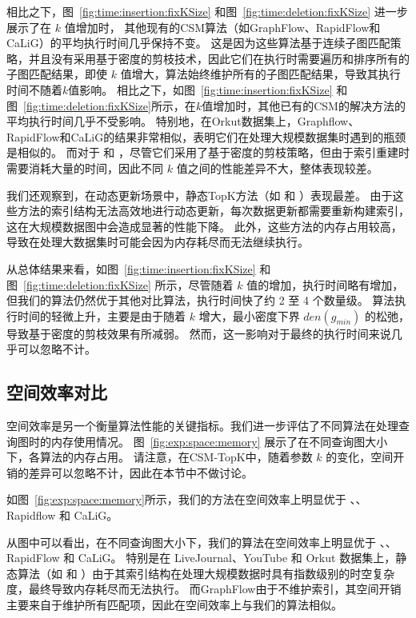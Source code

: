 相比之下，图~\ref{fig:time:insertion:fixKSize} 和图~\ref{fig:time:deletion:fixKSize} 进一步展示了在 $k$ 值增加时，
其他现有的CSM算法（如GraphFlow、RapidFlow和CaLiG）的平均执行时间几乎保持不变。
这是因为这些算法基于连续子图匹配策略，并且没有采用基于密度的剪枝技术，因此它们在执行时需要遍历和排序所有的子图匹配结果，即使 $k$ 值增大，算法始终维护所有的子图匹配结果，导致其执行时间不随着$k$值影响。
相比之下，如图~\ref{fig:time:insertion:fixKSize} 和图~\ref{fig:time:deletion:fixKSize}所示，在$k$值增加时，其他已有的CSM的解决方法的平均执行时间几乎不受影响。
特别地，在Orkut数据集上，Graphflow、RapidFlow和CaLiG的结果非常相似，表明它们在处理大规模数据集时遇到的瓶颈是相似的。
而对于 \itk 和 \pm，尽管它们采用了基于密度的剪枝策略，但由于索引重建时需要消耗大量的时间，因此不同 $k$ 值之间的性能差异不大，整体表现较差。

我们还观察到，在动态更新场景中，静态TopK方法（如 \itk 和 \pm）表现最差。
由于这些方法的索引结构无法高效地进行动态更新，每次数据更新都需要重新构建索引，这在大规模数据图中会造成显著的性能下降。
此外，这些方法的内存占用较高，导致在处理大数据集时可能会因为内存耗尽而无法继续执行。


从总体结果来看，如图~\ref{fig:time:insertion:fixKSize} 和图~\ref{fig:time:deletion:fixKSize} 所示，尽管随着 $k$ 值的增加，执行时间略有增加，但我们的算法仍然优于其他对比算法，执行时间快了约 2 至 4 个数量级。
算法执行时间的轻微上升，主要是由于随着 $k$ 增大，最小密度下界 $den(g_{min})$ 的松弛，导致基于密度的剪枝效果有所减弱。
然而，这一影响对于最终的执行时间来说几乎可以忽略不计。


\subsection{空间效率对比}
\label{ch5:space}

空间效率是另一个衡量算法性能的关键指标。我们进一步评估了不同算法在处理查询图时的内存使用情况。
图~\ref{fig:exp:space:memory} 展示了在不同查询图大小下，各算法的内存占用。
请注意，在CSM-TopK中，随着参数 $k$ 的变化，空间开销的差异可以忽略不计，因此在本节中不做讨论。

如图~\ref{fig:exp:space:memory}所示，我们的方法在空间效率上明显优于 \itk、\pm、Rapidflow 和 CaLiG。

从图中可以看出，在不同查询图大小下，我们的算法在空间效率上明显优于 \itk、\pm、RapidFlow 和 CaLiG。
特别是在 LiveJournal、YouTube 和 Orkut 数据集上，静态算法（如 \itk 和 \pm）由于其索引结构在处理大规模数据时具有指数级别的时空复杂度，最终导致内存耗尽而无法执行。
而GraphFlow由于不维护索引，其空间开销主要来自于维护所有匹配项，因此在空间效率上与我们的算法相似。


